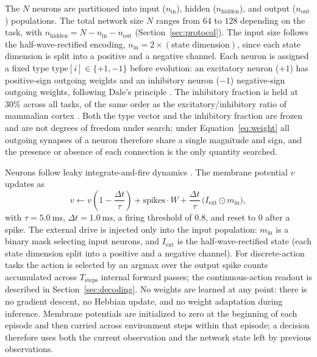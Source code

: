 \documentclass[10pt]{article}
\begin{document}
The $N$ neurons are partitioned into input ($n_\text{in}$), hidden
($n_\text{hidden}$), and output ($n_\text{out}$) populations. The total network
size $N$ ranges from $64$ to $128$ depending on the task, with
$n_\text{hidden} = N - n_\text{in} - n_\text{out}$
(Section~\ref{sec:protocol}). The input size follows the half-wave-rectified
encoding, $n_\text{in} = 2 \times (\text{state dimension})$, since each state
dimension is split into a positive and a negative channel. Each neuron is
assigned a fixed type
$\text{type}[i] \in \{+1,-1\}$ before evolution: an excitatory neuron ($+1$) has
positive-sign outgoing weights and an inhibitory neuron ($-1$) negative-sign
outgoing weights, following Dale's principle \citep{eccles1976,strata1999}. The inhibitory
fraction is held at $30\%$ across all tasks, of the same order as the
excitatory/inhibitory ratio of mammalian cortex \citep{markram2004}. Both the
type vector and the inhibitory fraction are frozen and are not degrees of
freedom under search; under Equation~\ref{eq:weight} all outgoing synapses of a
neuron therefore share a single magnitude and sign, and the presence or absence
of each connection is the only quantity searched.

Neurons follow leaky integrate-and-fire dynamics \citep{gerstner2014}. The
membrane potential $v$ updates as
\begin{equation}
v \leftarrow v\left(1 - \frac{\Delta t}{\tau}\right) + \text{spikes}\cdot W + \frac{\Delta t}{\tau}\,\big(I_\text{ext}\odot m_\text{in}\big),
\label{eq:lif}
\end{equation}
with $\tau = 5.0~\text{ms}$, $\Delta t = 1.0~\text{ms}$, a firing threshold of
$0.8$, and reset to $0$ after a spike. The external drive is injected only into
the input population: $m_\text{in}$ is a binary mask selecting input neurons, and
$I_\text{ext}$ is the half-wave-rectified state (each state dimension split into
a positive and a negative channel). For discrete-action tasks the action is selected by an argmax
over the output spike counts accumulated across $T_\text{steps}$ internal
forward passes; the continuous-action readout is described in
Section~\ref{sec:decoding}. No weights are learned at any point: there is no
gradient descent, no Hebbian update, and no weight adaptation during inference.
Membrane potentials are initialized to zero at the beginning of each episode and
then carried across environment steps within that episode; a decision therefore
uses both the current observation and the network state left by previous
observations.
\end{document}
